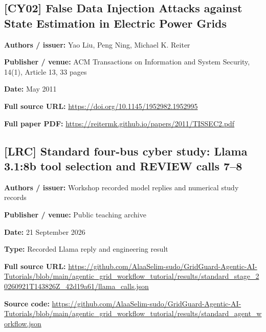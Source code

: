 \documentclass[10pt,letterpaper]{article}
\begin{document}
\subsection*{[CY02] False Data Injection Attacks against State Estimation in Electric Power Grids}
\textbf{Authors / issuer:} Yao Liu, Peng Ning, Michael K. Reiter\par
\textbf{Publisher / venue:} ACM Transactions on Information and System Security, 14(1), Article 13, 33 pages\par
\textbf{Date:} May 2011\par
\textbf{Full source URL:} \href{https://doi.org/10.1145/1952982.1952995}{\small\ttfamily https:/\allowbreak{}/\allowbreak{}doi.\allowbreak{}org/\allowbreak{}10.\allowbreak{}1145/\allowbreak{}1952982.\allowbreak{}1952995}\par
\textbf{Full paper PDF:} \href{https://reitermk.github.io/papers/2011/TISSEC2.pdf}{\small\ttfamily https:/\allowbreak{}/\allowbreak{}reitermk.\allowbreak{}github.\allowbreak{}io/\allowbreak{}papers/\allowbreak{}2011/\allowbreak{}TISSEC2.\allowbreak{}pdf}\par
\par\medskip
\subsection*{[LRC] Standard four-bus cyber study: Llama 3.1:8b tool selection and REVIEW calls 7--8}
\textbf{Authors / issuer:} Workshop recorded model replies and numerical study records\par
\textbf{Publisher / venue:} Public teaching archive\par
\textbf{Date:} 21 September 2026\par
\textbf{Type:} Recorded Llama reply and engineering result\par
\textbf{Full source URL:} \href{https://github.com/AlaaSelim-sudo/GridGuard-Agentic-AI-Tutorials/blob/main/agentic_grid_workflow_tutorial/results/standard_stage_20260921T143826Z_42d19a61/llama_calls.json}{\small\ttfamily https:/\allowbreak{}/\allowbreak{}github.\allowbreak{}com/\allowbreak{}AlaaSelim-\allowbreak{}sudo/\allowbreak{}GridGuard-\allowbreak{}Agentic-\allowbreak{}AI-\allowbreak{}Tutorials/\allowbreak{}blob/\allowbreak{}main/\allowbreak{}agentic\_\allowbreak{}grid\_\allowbreak{}workflow\_\allowbreak{}tutorial/\allowbreak{}results/\allowbreak{}standard\_\allowbreak{}stage\_\allowbreak{}20260921T143826Z\_\allowbreak{}42d19a61/\allowbreak{}llama\_\allowbreak{}calls.\allowbreak{}json}\par
\textbf{Source code:} \href{https://github.com/AlaaSelim-sudo/GridGuard-Agentic-AI-Tutorials/blob/main/agentic_grid_workflow_tutorial/results/standard_agent_workflow.json}{\small\ttfamily https:/\allowbreak{}/\allowbreak{}github.\allowbreak{}com/\allowbreak{}AlaaSelim-\allowbreak{}sudo/\allowbreak{}GridGuard-\allowbreak{}Agentic-\allowbreak{}AI-\allowbreak{}Tutorials/\allowbreak{}blob/\allowbreak{}main/\allowbreak{}agentic\_\allowbreak{}grid\_\allowbreak{}workflow\_\allowbreak{}tutorial/\allowbreak{}results/\allowbreak{}standard\_\allowbreak{}agent\_\allowbreak{}workflow.\allowbreak{}json}\par
\par\medskip
\end{document}
